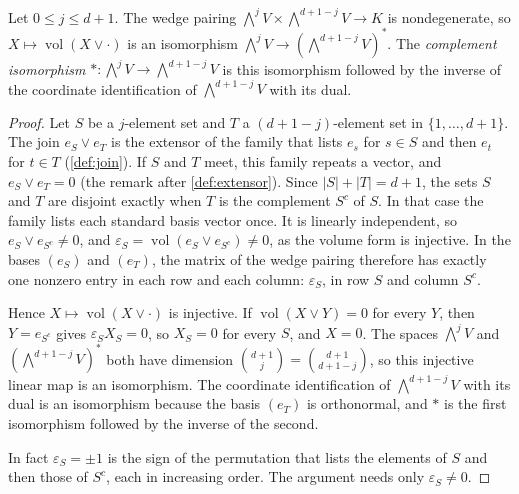 \begin{definition}
  \label{def:meet-complement-iso}
  \leanok
  Let $0 \le j \le d+1$. The wedge pairing
  $\bigwedge^{j} V \times \bigwedge^{d+1-j} V \to K$ is nondegenerate,
  so $X \mapsto \operatorname{vol}(X \vee \cdot)$ is an isomorphism
  $\bigwedge^{j} V \to (\bigwedge^{d+1-j} V)^*$. The \emph{complement
  isomorphism} $* \colon \bigwedge^{j} V \to \bigwedge^{d+1-j} V$ is this
  isomorphism followed by the inverse of the coordinate identification
  of $\bigwedge^{d+1-j} V$ with its dual.
\end{definition}
\begin{proof}
  \leanok
  Let $S$ be a $j$-element set and $T$ a $(d+1-j)$-element set in
  $\{1, \dots, d+1\}$. The join $e_S \vee e_T$ is the extensor of the
  family that lists $e_s$ for $s \in S$ and then $e_t$ for $t \in T$
  (\cref{def:join}). If $S$ and $T$ meet, this family repeats a vector,
  and $e_S \vee e_T = 0$ (the remark after \cref{def:extensor}). Since
  $|S| + |T| = d+1$, the sets $S$ and $T$ are disjoint exactly when $T$
  is the complement $S^c$ of $S$. In that case the family lists each
  standard basis vector once. It is linearly independent, so
  $e_S \vee e_{S^c} \neq 0$, and
  $\varepsilon_S = \operatorname{vol}(e_S \vee e_{S^c}) \neq 0$, as the
  volume form is injective. In the bases $(e_S)$ and $(e_T)$, the matrix
  of the wedge pairing therefore has exactly one nonzero entry in each row
  and each column: $\varepsilon_S$, in row $S$ and column $S^c$.

  Hence $X \mapsto \operatorname{vol}(X \vee \cdot)$ is injective. If
  $\operatorname{vol}(X \vee Y) = 0$ for every $Y$, then $Y = e_{S^c}$
  gives $\varepsilon_S X_S = 0$, so $X_S = 0$ for every $S$, and $X = 0$.
  The spaces $\bigwedge^{j} V$ and $(\bigwedge^{d+1-j} V)^*$ both have
  dimension $\binom{d+1}{j} = \binom{d+1}{d+1-j}$, so this injective
  linear map is an isomorphism. The coordinate identification of
  $\bigwedge^{d+1-j} V$ with its dual is an isomorphism because the basis
  $(e_T)$ is orthonormal, and $*$ is the first isomorphism followed by
  the inverse of the second.

  In fact $\varepsilon_S = \pm 1$ is the sign of the permutation that
  lists the elements of $S$ and then those of $S^c$, each in increasing
  order. The argument needs only $\varepsilon_S \neq 0$.
\end{proof}

